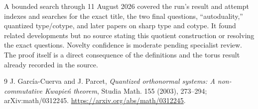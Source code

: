 \documentclass[11pt]{article}
\begin{document}
A bounded search through 11 August 2026 covered the run's result and attempt
indexes and searches for the exact title, the two final questions,
``autoduality,'' quantized type/cotype, and later papers on sharp type and
cotype.  It found related developments but no source stating this quotient
construction or resolving the exact questions.  Novelty confidence is
moderate pending specialist review.  The proof itself is a direct consequence
of the definitions and the torus result already recorded in the source.

\begin{thebibliography}{9}
J. Garc\'ia-Cuerva and J. Parcet,
\emph{Quantized orthonormal systems: A non-commutative Kwapie\'n theorem},
Studia Math. 155 (2003), 273--294; arXiv:math/0312245.
\url{https://arxiv.org/abs/math/0312245}.
\end{thebibliography}
\end{document}
